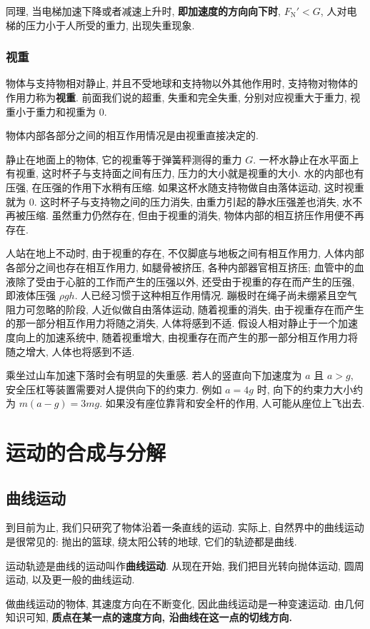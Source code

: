 \documentclass[UTF8,openany,fontset=fandol]{ctexbook}
\theoremstyle{chinesetextbook}
\begin{document}
同理, 当电梯加速下降或者减速上升时, \textbf{即加速度的方向向下时}, $F_\text{N}'<G$, 人对电梯的压力小于人所受的重力, 出现失重现象.
\subsection*{视重}
物体与支持物相对静止, 并且不受地球和支持物以外其他作用时, 支持物对物体的作用力称为\textbf{视重}. 前面我们说的超重, 失重和完全失重, 分别对应视重大于重力, 视重小于重力和视重为 0.

物体内部各部分之间的相互作用情况是由视重直接决定的.

静止在地面上的物体, 它的视重等于弹簧秤测得的重力 $G$. 一杯水静止在水平面上有视重, 这时杯子与支持面之间有压力, 压力的大小就是视重的大小. 水的内部也有压强, 在压强的作用下水稍有压缩. 如果这杯水随支持物做自由落体运动, 这时视重就为 0. 这时杯子与支持物之间的压力消失, 由重力引起的静水压强差也消失, 水不再被压缩. 虽然重力仍然存在, 但由于视重的消失, 物体内部的相互挤压作用便不再存在.

人站在地上不动时, 由于视重的存在, 不仅脚底与地板之间有相互作用力, 人体内部各部分之间也存在相互作用力, 如腿骨被挤压, 各种内部器官相互挤压; 血管中的血液除了受由于心脏的工作而产生的压强以外, 还受由于视重的存在而产生的压强, 即液体压强 $\rho gh$. 人已经习惯于这种相互作用情况. 蹦极时在绳子尚未绷紧且空气阻力可忽略的阶段, 人近似做自由落体运动, 随着视重的消失, 由于视重存在而产生的那一部分相互作用力将随之消失, 人体将感到不适. 假设人相对静止于一个加速度向上的加速系统中, 随着视重增大, 由视重存在而产生的那一部分相互作用力将随之增大, 人体也将感到不适.

乘坐过山车加速下落时会有明显的失重感. 若人的竖直向下加速度为 $a$ 且 $a>g$, 安全压杠等装置需要对人提供向下的约束力. 例如 $a=4g$ 时, 向下的约束力大小约为 $m(a-g)=3mg$. 如果没有座位靠背和安全杆的作用, 人可能从座位上飞出去.
\chapter{运动的合成与分解}
\section{曲线运动}
到目前为止, 我们只研究了物体沿着一条直线的运动. 实际上, 自然界中的曲线运动是很常见的: 抛出的篮球, 绕太阳公转的地球, 它们的轨迹都是曲线.

运动轨迹是曲线的运动叫作\textbf{曲线运动}. 从现在开始, 我们把目光转向抛体运动, 圆周运动, 以及更一般的曲线运动.

做曲线运动的物体, 其速度方向在不断变化, 因此曲线运动是一种变速运动. 由几何知识可知, \textbf{质点在某一点的速度方向, 沿曲线在这一点的切线方向.}
\end{document}
